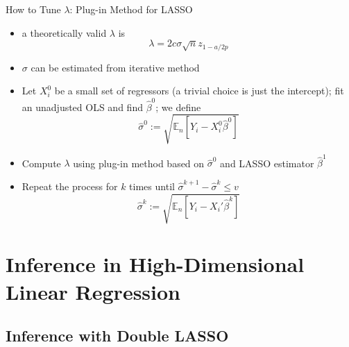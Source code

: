 \documentclass[aspectratio=1610,12pt,xcolor=dvipsnames]{beamer}
\begin{document}
\begin{frame}{How to Tune $\lambda$: Plug-in Method for LASSO}

\begin{itemize}
    \item a theoretically valid $\lambda$ is 
    \[
    \lambda = 2 c \sigma \sqrt{n}z_{1-a/2p}
    \]
    \item $\sigma$ can be estimated from iterative method
    \item Let $X_i^{0}$ be a small set of regressors (a trivial choice is just the intercept); fit an unadjusted OLS and find $\hat \beta^0$; we define
    \[
    \hat \sigma^0 := \sqrt{\mathbb{E}_n [Y_i - X_{i}^{0} \hat \beta^0]}
    \]
    \item Compute $\lambda$ using plug-in method based on $\hat \sigma^0$ and LASSO estimator $\hat \beta^1$
    \item Repeat the process for $k$ times until $\hat \sigma^{k+1} - \hat \sigma^{k} \leq v$
    \[
    \hat \sigma^{k} := \sqrt{\mathbb{E}_n [Y_i - X_{i}' \hat \beta^k]}
    \]
\end{itemize}
\end{frame}

\section{Inference in High-Dimensional Linear Regression}

\begin{frame}
  \sectionpage
\end{frame}

\subsection{Inference with Double LASSO}
\end{document}
